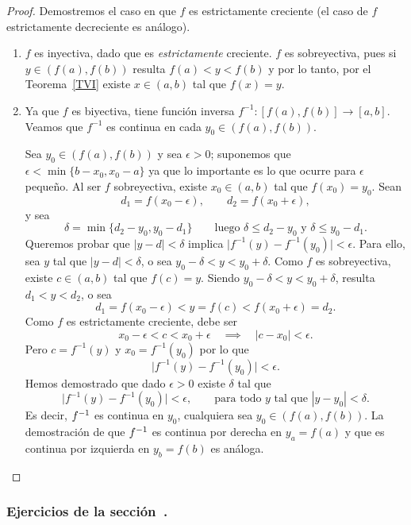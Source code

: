 \begin{proof}
    Demostremos el caso en que $f$ es estrictamente creciente (el caso de $f$ estrictamente decreciente es análogo).

\begin{enumerate}[{\bf (a)}]
\item $f$ es inyectiva, dado que es \emph{estrictamente} creciente. $f$ es sobreyectiva, pues si $y\in (f(a),f(b))$ resulta $f(a)<y<f(b)$ y por lo tanto, por el Teorema~\ref{TVI} existe $x\in(a,b)$ tal que $f(x)=y$.

\item Ya que $f$ es biyectiva, tiene función inversa $f^{-1}:[f(a),f(b)]\to [a,b]$. Veamos que $f^{-1}$ es continua en cada $y_0\in(f(a),f(b))$. 

Sea $y_0\in(f(a),f(b))$ y sea $\epsilon>0$; suponemos que $\epsilon<\min\{b-x_0,x_0-a\}$ ya que lo importante es lo que ocurre para $\epsilon$ pequeño. Al ser $f$ sobreyectiva, existe $x_0\in(a,b)$ tal que $f(x_0)=y_0$.
Sean
\[
d_1=f(x_0-\epsilon), 
\qquad
d_2=f(x_0+\epsilon),
\]
y sea
\[
\delta=\min\{d_2-y_0,y_0-d_1\}
\qquad\text{luego $\delta\le d_2-y_0$ y $\delta\le y_0-d_1$}.
\]
Queremos probar que $|y-d|<\delta$ implica $\big|f^{-1}(y)-f^{-1}(y_0)\big|<\epsilon$.
Para ello, sea $y$ tal que $|y-d|<\delta$, o sea $y_0-\delta<y<y_0+\delta$.
Como $f$ es sobreyectiva, existe $c\in(a,b)$ tal que $f(c)=y$.
Siendo $y_0-\delta<y<y_0+\delta$, resulta $d_1<y<d_2$, o sea
\[
d_1=f(x_0-\epsilon)<y=f(c)<f(x_0+\epsilon)=d_2.
\]
Como $f$ es estrictamente creciente, debe ser
\[
x_0-\epsilon < c < x_0+\epsilon 
\quad\implies\quad
|c-x_0|<\epsilon.
\]
Pero $c=f^{-1}(y)$ y $x_0=f^{-1}(y_0)$ por lo que
\[
\big|f^{-1}(y)-f^{-1}(y_0)\big|<\epsilon.
\]
Hemos demostrado que dado $\epsilon>0$ existe $\delta$ tal que
\[
\big|f^{-1}(y)-f^{-1}(y_0)\big|<\epsilon,
\qquad\text{para todo $y$ tal que $|y-y_0|<\delta$}.
\]
Es decir, $f^{-1}$ es continua en $y_0$, cualquiera sea $y_0\in(f(a),f(b))$.
La demostración de que $f^{-1}$ es continua por derecha en $y_a=f(a)$ y que es continua por izquierda en $y_b=f(b)$ es análoga.
\end{enumerate}
\end{proof}


\subsubsection*{Ejercicios de la sección~.}

\begin{enumerate}

\end{enumerate}

